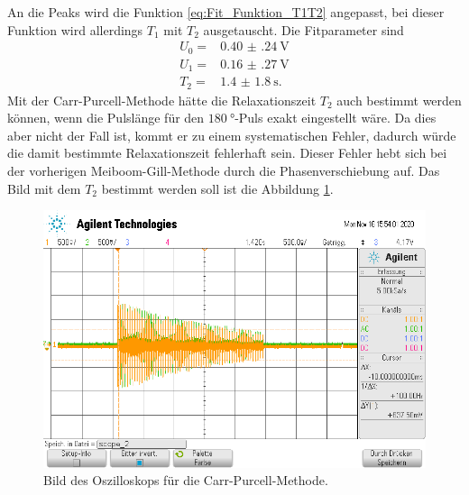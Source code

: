 An die Peaks wird die Funktion \eqref{eq:Fit_Funktion_T1T2} angepasst, bei dieser Funktion wird allerdings $T_{\text{1}}$
mit $T_{\text{2}}$ ausgetauscht.
Die Fitparameter sind
\begin{align*}
  U_{\text{0}} =& \SI{0.40(24)}{\volt}\\
  U_{\text{1}} =& \SI{0.16(27)}{\volt}\\
  T_{\text{2}} =& \SI{1.4(18)}{\second}.
\end{align*}
\FloatBarrier
Mit der Carr-Purcell-Methode hätte die Relaxationszeit $T_{\text{2}}$ auch bestimmt werden können, wenn die Pulslänge 
für den $\SI{180}{\degree}$-Puls exakt eingestellt wäre. Da dies aber nicht der Fall ist, kommt er zu einem systematischen
Fehler, dadurch würde die damit bestimmte Relaxationszeit fehlerhaft sein.
Dieser Fehler hebt sich bei der vorherigen Meiboom-Gill-Methode durch die Phasenverschiebung auf.
Das Bild mit dem $T_{\text{2}}$ bestimmt werden 
soll ist die Abbildung \ref{fig:CPM}. 
\begin{figure}
  \centering
  \includegraphics[width = \textwidth,keepaspectratio]{../Bilder/scope_2.png}
  \caption{Bild des Oszilloskops für die Carr-Purcell-Methode.}
  \label{fig:CPM}
\end{figure}
\FloatBarrier
